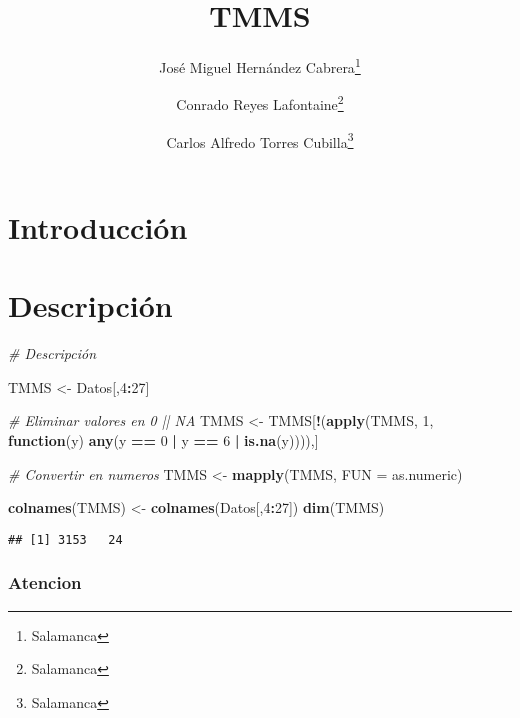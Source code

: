 \documentclass[
  10pt,
  spanish,
]{article}
\title{TMMS}
\author{José Miguel Hernández Cabrera\footnote{Salamanca} \and Conrado Reyes Lafontaine\footnote{Salamanca} \and Carlos Alfredo Torres Cubilla\footnote{Salamanca}}
\date{}
\newenvironment{Shaded}{\begin{snugshade}}{\end{snugshade}}
\newcommand{\CommentTok}[1]{\textcolor[rgb]{0.56,0.35,0.01}{\textit{#1}}}
\newcommand{\ControlFlowTok}[1]{\textcolor[rgb]{0.13,0.29,0.53}{\textbf{#1}}}
\newcommand{\DataTypeTok}[1]{\textcolor[rgb]{0.13,0.29,0.53}{#1}}
\newcommand{\DecValTok}[1]{\textcolor[rgb]{0.00,0.00,0.81}{#1}}
\newcommand{\KeywordTok}[1]{\textcolor[rgb]{0.13,0.29,0.53}{\textbf{#1}}}
\newcommand{\NormalTok}[1]{#1}
\newcommand{\OperatorTok}[1]{\textcolor[rgb]{0.81,0.36,0.00}{\textbf{#1}}}
\newcommand{\StringTok}[1]{\textcolor[rgb]{0.31,0.60,0.02}{#1}}
\begin{document}
\maketitle

\hypertarget{introducciuxf3n}{%
\section{Introducción}\label{introducciuxf3n}}

\hypertarget{descripciuxf3n}{%
\section{Descripción}\label{descripciuxf3n}}

\begin{Shaded}
\begin{Highlighting}[]
\CommentTok{# Descripción}
\end{Highlighting}
\end{Shaded}

\begin{Shaded}
\begin{Highlighting}[]
\NormalTok{TMMS <-}\StringTok{ }\NormalTok{Datos[,}\DecValTok{4}\OperatorTok{:}\DecValTok{27}\NormalTok{]}

\CommentTok{# Eliminar valores en 0 || NA}
\NormalTok{TMMS <-}\StringTok{ }\NormalTok{TMMS[}\OperatorTok{!}\NormalTok{(}\KeywordTok{apply}\NormalTok{(TMMS, }\DecValTok{1}\NormalTok{, }\ControlFlowTok{function}\NormalTok{(y) }\KeywordTok{any}\NormalTok{(y }\OperatorTok{==}\StringTok{ }\DecValTok{0} \OperatorTok{|}\StringTok{ }\NormalTok{y }\OperatorTok{==}\StringTok{ }\DecValTok{6} \OperatorTok{|}\StringTok{ }\KeywordTok{is.na}\NormalTok{(y)))),]}

\CommentTok{# Convertir en numeros}
\NormalTok{TMMS <-}\StringTok{ }\KeywordTok{mapply}\NormalTok{(TMMS, }\DataTypeTok{FUN =}\NormalTok{ as.numeric)}

\KeywordTok{colnames}\NormalTok{(TMMS) <-}\StringTok{ }\KeywordTok{colnames}\NormalTok{(Datos[,}\DecValTok{4}\OperatorTok{:}\DecValTok{27}\NormalTok{])}
\KeywordTok{dim}\NormalTok{(TMMS)}
\end{Highlighting}
\end{Shaded}

\begin{verbatim}
## [1] 3153   24
\end{verbatim}

\hypertarget{atencion}{%
\subsubsection{Atencion}\label{atencion}}
\end{document}
